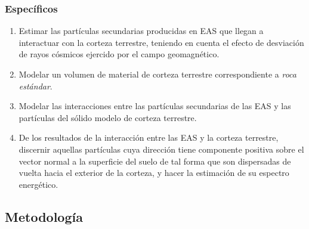 \documentclass[12pt]{report}
\begin{document}
\subsubsection*{Específicos}
\begin{enumerate}
    \item Estimar las partículas secundarias producidas en EAS que llegan a interactuar con la corteza terrestre, teniendo en cuenta el efecto de desviación de rayos cósmicos ejercido por el campo geomagnético.
    \item Modelar un volumen de material de corteza terrestre correspondiente a \textit{roca estándar}.
    \item Modelar las interacciones entre las partículas secundarias de las EAS y las partículas del sólido modelo de corteza terrestre.
    \item De los resultados de la interacción entre las EAS y la corteza terrestre, discernir aquellas partículas cuya dirección tiene componente positiva sobre el vector normal a la superficie del suelo de tal forma que son dispersadas de vuelta hacia el exterior de la corteza, y hacer la estimación de su espectro energético.
\end{enumerate}

\subsection*{Metodología}
\end{document}
